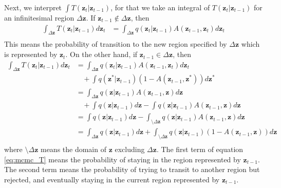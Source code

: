 \documentclass[a4]{article}
\begin{document}
Next, we interpret $\int T\left(\bm{z}_{t}|\bm{z}_{t-1}\right)$, for that we take an integral of
$T\left(\bm{z}_{t}|\bm{z}_{t-1}\right)$ for an infinitesimal region $\Delta\bm{z}$.
If $\bm{z}_{t-1} \notin \Delta\bm{z}$, then
\begin{equation}
\begin{aligned}
\int_{\Delta\bm{z}} T\left(\bm{z}_{t}|\bm{z}_{t-1}\right)d\bm{z}_t
&= \int_{\Delta\bm{z}} q\left(\bm{z}_{t}|\bm{z}_{t-1}\right)A\left(\bm{z}_{t-1}, \bm{z}_{t}\right)d\bm{z}_t\\
\end{aligned}
\end{equation}
This means the probability of transition to the new region specified by $\Delta\bm{z}$ which is represented by $\bm{z}_t$.
On the other hand, if $\bm{z}_{t-1} \in \Delta\bm{z}$, then
\begin{equation}
\begin{aligned}
\int_{\Delta\bm{z}} T\left(\bm{z}_{t}|\bm{z}_{t-1}\right)d\bm{z}_t
&= \int_{\Delta\bm{z}} q\left(\bm{z}_{t}|\bm{z}_{t-1}\right)A\left(\bm{z}_{t-1}, \bm{z}_{t}\right)d\bm{z}_t\\
&\:\:\:\:+ \int q\left(\bm{z}^*|\bm{z}_{t-1}\right)\left(1 - A\left(\bm{z}_{t-1}, \bm{z}^*\right)\right)d\bm{z}^*\\
&= \int_{\Delta\bm{z}} q\left(\bm{z}|\bm{z}_{t-1}\right) A\left(\bm{z}_{t-1}, \bm{z}\right)d\bm{z}\\
&\:\:\:\:+ \int q\left(\bm{z}|\bm{z}_{t-1}\right)d\bm{z}
- \int q\left(\bm{z}|\bm{z}_{t-1}\right) A\left(\bm{z}_{t-1}, \bm{z}\right)d\bm{z}\\
&= \int q\left(\bm{z}|\bm{z}_{t-1}\right)d\bm{z}
- \int_{\setminus\Delta\bm{z}} q\left(\bm{z}|\bm{z}_{t-1}\right) A\left(\bm{z}_{t-1}, \bm{z}\right)d\bm{z}\\
&= \int_{\Delta\bm{z}} q\left(\bm{z}|\bm{z}_{t-1}\right)d\bm{z}
+ \int_{\setminus\Delta\bm{z}} q\left(\bm{z}|\bm{z}_{t-1}\right)\left(1 - A\left(\bm{z}_{t-1}, \bm{z}\right)\right)d\bm{z}\label{eq:mcmc_T}\\
\end{aligned}
\end{equation}
where $\setminus\Delta\bm{z}$ means the domain of $\bm{z}$ excluding $\Delta\bm{z}$.
The first term of equation \ref{eq:mcmc_T} means the probability of staying in the region represented by $\bm{z}_{t-1}$.
The second term means the probability of trying to transit to another region but rejected, and eventually staying in the
current region represented by $\bm{z}_{t-1}$.
\end{document}
